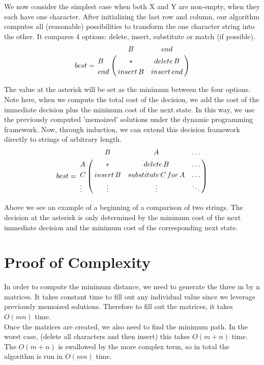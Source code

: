 \documentclass{article}
\begin{document}
We now consider the simplest case when both X and Y are non-empty, when they each have one character. After initializing the last row and column, our algorithm computes all (reasonable) possibilities to transform the one character string into the other.  It compares 4 options: delete, insert, substitute or match (if possible).
\begin{align*}
best = \bordermatrix{~ & B & end \cr
				 B & * & delete \, B \cr
                  		 end & insert \, B & insert\,end  \cr}
\end{align*}

The value at the asterisk will be set as the minimum between the four options.  Note here, when we compute the total cost of the decision, we add the cost of the immediate decision plus the minimum cost of the next state.  In this way, we use the previously computed 'memoized' solutions under the dynamic programming framework.  Now, through induction, we can extend this decision framework directly to strings of arbitrary length.  
\begin{align*}
best = \bordermatrix{~ & B & A & \hdots \cr
				 A & * & delete \, B & \hdots \cr
                  		 C & insert \, B & substitute\,C\,for\,A  & \hdots \cr
		 		 \vdots & \vdots & \vdots & \ddots \cr}
\end{align*}

Above we see an example of a beginning of a comparison of two strings.  The decision at the asterisk is only determined by the minimum cost of the next immediate decision and the minimum cost of the corresponding next state.

\section*{Proof of Complexity}

In order to compute the minimum distance, we need to generate the three m by n matrices.  It takes constant time to fill out any individual value since we leverage previously memoized solutions. Therefore to fill out the matrices, it takes $O(mn)$ time. \\

Once the matrices are created, we also need to find the minimum path.  In the worst case, (delete all characters and then insert) this takes $O(m+n)$ time. \\

The $O(m+n)$ is swallowed by the more complex term, so in total the algorithm is run in $O(mn)$ time.
\end{document}

